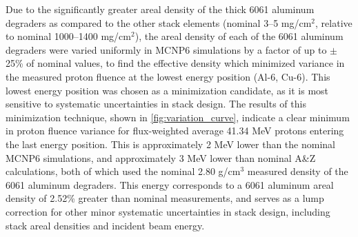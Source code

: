 \documentclass[3p]{elsarticle}
\begin{document}
Due to the  
significantly greater areal density of the thick 6061 aluminum degraders as compared to the other stack elements (nominal 3--5 mg/cm$^2$, relative to nominal 1000--1400 mg/cm$^2$),
the areal density of each of the 6061 aluminum degraders  were varied uniformly in MCNP6 simulations  by a factor of up to $\pm$25\% of nominal values, to find the effective density which minimized variance in the measured proton fluence at the lowest energy position (Al-6, Cu-6).
This lowest energy position was chosen as a minimization candidate, as it is most sensitive to systematic uncertainties in stack design.
The results of this minimization technique, shown in \autoref{fig:variation_curve}, indicate a clear minimum in proton fluence variance for flux-weighted average 41.34 MeV protons entering the last energy position.
This is approximately 2 MeV lower than the nominal MCNP6 simulations, and approximately 3 MeV lower than nominal A\&Z calculations, both of which used the nominal 2.80 g/cm$^3$ measured density of the 6061 aluminum degraders.
This energy corresponds to a 6061 aluminum areal density of 2.52\% greater than nominal measurements, and serves as a lump correction for other minor systematic uncertainties in stack design, including stack areal densities and incident beam energy.
\end{document}
